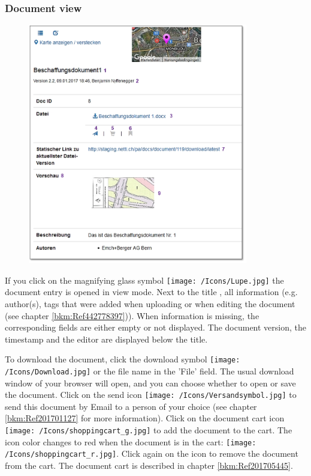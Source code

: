 \pagebreak
\subsubsection{Document view}
\label{bkm:Ref443047930}

\begin{figure}
\vspace{-15pt}
\includegraphics[height=105mm]{../chapters/11_Dokumentenablage/pictures/11-2-5_Dokumentenansicht.jpg}
\end{figure}

If you click on the magnifying glass symbol \texttt{[image: /Icons/Lupe.jpg]} the document entry is opened in view mode. Next to the title , all information (e.g. author(s), tags that were added when uploading or when editing the document (see chapter \ref{bkm:Ref442778397})). When information is missing, the corresponding fields are either empty or not displayed. The document version, the timestamp and the editor  are displayed below the title. \newline

To download the document, click the download symbol \texttt{[image: /Icons/Download.jpg]} or the file name  in the 'File' field. The usual download window of your browser will open, and you can choose whether to open or save the document. Click on the send icon \texttt{[image: /Icons/Versandsymbol.jpg]}  to send this document by Email to a person of your choice (see chapter \ref{bkm:Ref201701127} for more information). Click on the document cart icon \texttt{[image: /Icons/shoppingcart\_g.jpg]}  to add the document to the cart. The icon color changes to red when the document is in the cart: \texttt{[image: /Icons/shoppingcart\_r.jpg]}. Click again on the icon to remove the document from the cart. The document cart is described in chapter \ref{bkm:Ref201705445}. \newline

